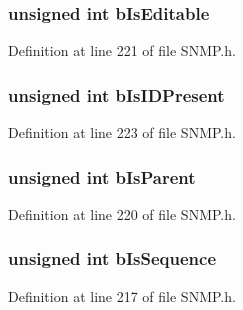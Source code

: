 \subsubsection[{b\+Is\+Editable}]{\setlength{\rightskip}{0pt plus 5cm}unsigned int b\+Is\+Editable}\label{union_m_i_b___i_n_f_o_a3261ab7b8974248ac32503f93ba0825c}


Definition at line 221 of file S\+N\+M\+P.\+h.

\hypertarget{union_m_i_b___i_n_f_o_a5fd8230be007a0d68d207392f84b8ef0}{}
\subsubsection[{b\+Is\+I\+D\+Present}]{\setlength{\rightskip}{0pt plus 5cm}unsigned int b\+Is\+I\+D\+Present}\label{union_m_i_b___i_n_f_o_a5fd8230be007a0d68d207392f84b8ef0}


Definition at line 223 of file S\+N\+M\+P.\+h.

\hypertarget{union_m_i_b___i_n_f_o_a39ea762ddcb8685bbad8cdbb629bb751}{}
\subsubsection[{b\+Is\+Parent}]{\setlength{\rightskip}{0pt plus 5cm}unsigned int b\+Is\+Parent}\label{union_m_i_b___i_n_f_o_a39ea762ddcb8685bbad8cdbb629bb751}


Definition at line 220 of file S\+N\+M\+P.\+h.

\hypertarget{union_m_i_b___i_n_f_o_a0eb5bfcecf84a00f348bf4037101eb51}{}
\subsubsection[{b\+Is\+Sequence}]{\setlength{\rightskip}{0pt plus 5cm}unsigned int b\+Is\+Sequence}\label{union_m_i_b___i_n_f_o_a0eb5bfcecf84a00f348bf4037101eb51}


Definition at line 217 of file S\+N\+M\+P.\+h.

